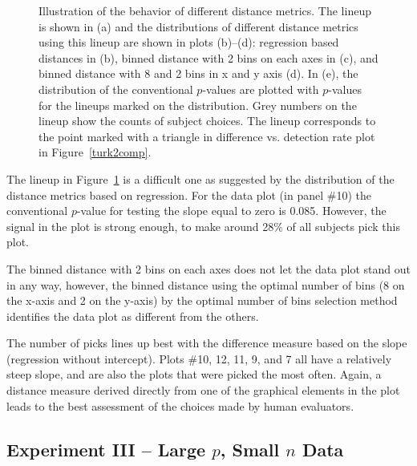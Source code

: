 \documentclass[12pt]{article}\usepackage[]{graphicx}\usepackage[]{color}
\newenvironment{knitrout}{}{} %
\begin{document}
\begin{figure}[!p]
\begin{subfigure}[t]{0.3\textwidth}
\begin{knitrout}
\end{knitrout}
\end{subfigure}

\caption{Illustration of the behavior of different distance metrics. The lineup is shown in (a) and the distributions of different distance metrics using this lineup are shown in plots (b)--(d): regression based distances in (b), binned distance with 2 bins on each axes in (c), and binned distance with 8 and 2 bins in x and y axis (d). In (e), the distribution of the conventional $p$-values are plotted with $p$-values for the lineups marked on the distribution. Grey numbers on the lineup show the counts of subject choices. The lineup corresponds to the point marked with a triangle in difference vs. detection rate plot in Figure~\ref{turk2comp}.}
\label{turk2-exp}
\end{figure}

The lineup in Figure~\ref{turk2-exp} is a difficult one as suggested by the distribution of the distance metrics based on regression. 
For the data plot (in panel \#10) the conventional $p$-value for testing the slope equal to zero is 0.085. However, the signal in the plot is strong enough, to make  around 28\% of all subjects pick this plot.

The binned distance with 2 bins on each axes does not let the data plot stand out in any way, however, the binned distance using the optimal number of bins (8 on the x-axis and 2 on the y-axis) by the optimal number of bins selection method identifies the data plot as different from the others. 

The number of picks lines up best with the difference measure based on the slope (regression without intercept). Plots \#10, 12, 11, 9, and 7 all have a relatively steep slope, and are also the plots that were picked the most often.  
Again, a distance measure derived directly from one of the graphical elements in the plot leads to the best assessment of the choices made by human evaluators.


\subsection{Experiment III -- Large $p$, Small $n$ Data}
\end{document}
